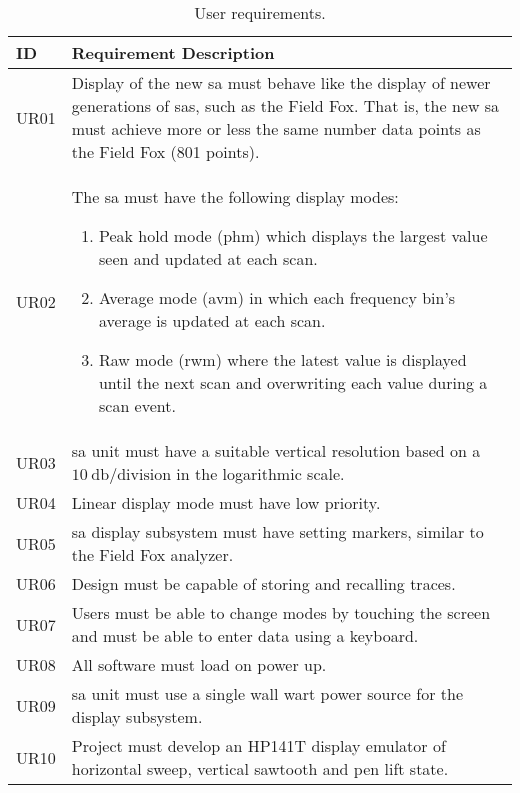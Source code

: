 \documentclass[class=report,11pt,crop=false]{standalone}
\begin{document}
\begin{table}[!ht]
	\centering
	\caption{User requirements.}
	\label{tab:user-requirements}
	\begin{tabular}{|m{5em}|m{40em}|}
		\hline
		\textbf{ID}	& \textbf{Requirement Description}\\
		\hline
		UR01	& Display of the new \acrshort{sa} must behave like the display of newer generations of \acrshort{sa}s, such as the Field Fox. That is, the new \acrshort{sa} must achieve more or less the same number data points as the Field Fox (801 points). \\
		\hline
		UR02	& The \acrshort{sa} must have the following display modes:
		\begin{enumerate}[label=(\alph*)]
			\item 
			Peak hold mode (\acrshort{phm}) which displays the largest value seen and updated at each scan.
			\item 
			Average mode (\acrshort{avm}) in which each frequency bin's average is updated at each scan. 
			\item 
			Raw mode (\acrshort{rwm}) where the latest value is displayed until the next scan and overwriting each value during a scan event.
		\end{enumerate}\\
		\hline
		UR03	& \acrshort{sa} unit must have a suitable vertical resolution based on a $\SI{10}{\decibel}\text{/division}$ in the logarithmic scale.\\
		\hline
		UR04	& Linear display mode must have low priority.\\
		\hline
		UR05	& \acrshort{sa} display subsystem must have setting markers, similar to the Field Fox analyzer.\\
		\hline
		UR06	& Design must be capable of storing and recalling traces.\\
		\hline
		UR07	& Users must be able to change modes by touching the screen and must be able to enter data using a keyboard.\\
		\hline
		UR08	& All software must load on power up.\\
		\hline
		UR09	& \acrshort{sa} unit must use a single wall wart power source for the display subsystem.\\
		\hline
		UR10	& Project must develop an HP141T display emulator of horizontal sweep, vertical sawtooth and pen lift state.\\
		\hline
	\end{tabular}
\end{table}
\end{document}
